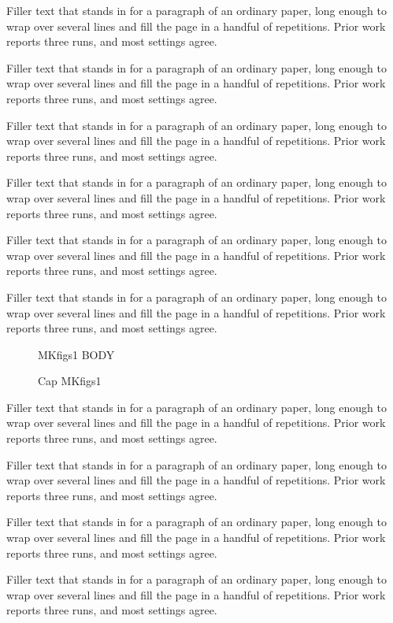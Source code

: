 \documentclass{article}
\begin{document}
Filler text that stands in for a paragraph of an ordinary paper, long enough to wrap over several lines and fill the page in a handful of repetitions. Prior work reports three runs, and most settings agree.\par
Filler text that stands in for a paragraph of an ordinary paper, long enough to wrap over several lines and fill the page in a handful of repetitions. Prior work reports three runs, and most settings agree.\par
Filler text that stands in for a paragraph of an ordinary paper, long enough to wrap over several lines and fill the page in a handful of repetitions. Prior work reports three runs, and most settings agree.\par
Filler text that stands in for a paragraph of an ordinary paper, long enough to wrap over several lines and fill the page in a handful of repetitions. Prior work reports three runs, and most settings agree.\par
Filler text that stands in for a paragraph of an ordinary paper, long enough to wrap over several lines and fill the page in a handful of repetitions. Prior work reports three runs, and most settings agree.\par
Filler text that stands in for a paragraph of an ordinary paper, long enough to wrap over several lines and fill the page in a handful of repetitions. Prior work reports three runs, and most settings agree.\par
\begin{figure}[t]\centering MKfigs1 BODY\caption{Cap MKfigs1}\label{fig:s1}\end{figure}
Filler text that stands in for a paragraph of an ordinary paper, long enough to wrap over several lines and fill the page in a handful of repetitions. Prior work reports three runs, and most settings agree.\par
Filler text that stands in for a paragraph of an ordinary paper, long enough to wrap over several lines and fill the page in a handful of repetitions. Prior work reports three runs, and most settings agree.\par
Filler text that stands in for a paragraph of an ordinary paper, long enough to wrap over several lines and fill the page in a handful of repetitions. Prior work reports three runs, and most settings agree.\par
Filler text that stands in for a paragraph of an ordinary paper, long enough to wrap over several lines and fill the page in a handful of repetitions. Prior work reports three runs, and most settings agree.\par
\end{document}
